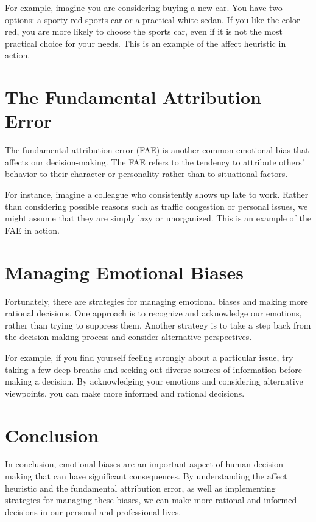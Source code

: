 \documentclass{report}%
\begin{document}
{{{{{{{{{{{{{{For example, imagine you are considering buying a new car. You have two options: a sporty red sports car or a practical white sedan. If you like the color red, you are more likely to choose the sports car, even if it is not the most practical choice for your needs. This is an example of the affect heuristic in action.

\section{The Fundamental Attribution Error}

The fundamental attribution error (FAE) is another common emotional bias that affects our decision-making. The FAE refers to the tendency to attribute others' behavior to their character or personality rather than to situational factors.

For instance, imagine a colleague who consistently shows up late to work. Rather than considering possible reasons such as traffic congestion or personal issues, we might assume that they are simply lazy or unorganized. This is an example of the FAE in action.

\section{Managing Emotional Biases}

Fortunately, there are strategies for managing emotional biases and making more rational decisions. One approach is to recognize and acknowledge our emotions, rather than trying to suppress them. Another strategy is to take a step back from the decision-making process and consider alternative perspectives.

For example, if you find yourself feeling strongly about a particular issue, try taking a few deep breaths and seeking out diverse sources of information before making a decision. By acknowledging your emotions and considering alternative viewpoints, you can make more informed and rational decisions.

\section{Conclusion}

In conclusion, emotional biases are an important aspect of human decision-making that can have significant consequences. By understanding the affect heuristic and the fundamental attribution error, as well as implementing strategies for managing these biases, we can make more rational and informed decisions in our personal and professional lives.%
}}}}}}}}}}}}}}
\end{document}

